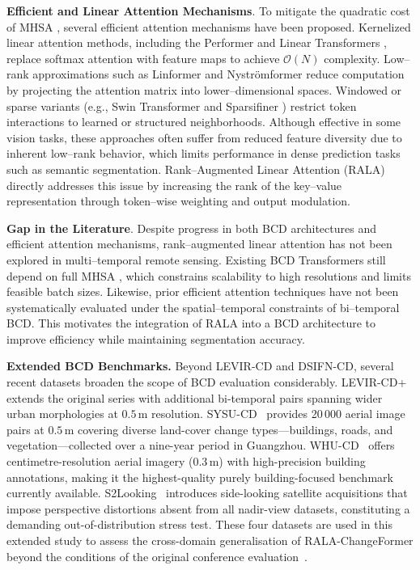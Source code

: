 \documentclass[runningheads]{llncs}
\newcommand{\journal}[1]{{\color{orange}#1}}
\begin{document}
\noindent \textbf{Efficient and Linear Attention Mechanisms}.
To mitigate the quadratic cost of MHSA \cite{Vaswani2017Attention}, several
efficient attention mechanisms have been proposed. Kernelized linear attention
methods, including the Performer \cite{Choromanski2021Performer} and Linear
Transformers \cite{Katharopoulos2020Linear}, replace softmax attention with
feature maps to achieve $\mathcal{O}(N)$ complexity. Low–rank approximations
such as Linformer \cite{Wang2020Linformer} and Nyströmformer
\cite{Xiong2021Nystromformer} reduce computation by projecting the attention
matrix into lower–dimensional spaces. Windowed or sparse variants (e.g., Swin
Transformer \cite{Liu2021Swin} and Sparsifiner \cite{Wei2023Sparsifiner})
restrict token interactions to learned or structured neighborhoods. Although
effective in some vision tasks, these approaches often suffer from reduced
feature diversity due to inherent low–rank behavior, which limits performance in
dense prediction tasks such as semantic segmentation. Rank–Augmented Linear
Attention (RALA) \cite{Fan2025RALA} directly addresses this issue by increasing
the rank of the key–value representation through token–wise weighting and output
modulation.

\noindent \textbf{Gap in the Literature}.
Despite progress in both BCD architectures and efficient attention mechanisms,
rank–augmented linear attention has not been explored in multi–temporal remote
sensing. Existing BCD Transformers still depend on full MHSA
\cite{Vaswani2017Attention}, which constrains scalability to high resolutions
and limits feasible batch sizes. Likewise, prior efficient attention techniques
have not been systematically evaluated under the spatial–temporal constraints of
bi–temporal BCD. This motivates the integration of RALA into a BCD architecture
to improve efficiency while maintaining segmentation accuracy.

\journal{%
\noindent \textbf{Extended BCD Benchmarks.}
Beyond LEVIR-CD and DSIFN-CD, several recent datasets broaden the scope of BCD
evaluation considerably.
LEVIR-CD+ \cite{Zheng2020LEVIR} extends the original series with additional
bi-temporal pairs spanning wider urban morphologies at $0.5\,\mathrm{m}$
resolution.
SYSU-CD~\cite{ShiSYSU2022} provides 20\,000 aerial image pairs at
$0.5\,\mathrm{m}$ covering diverse land-cover change types—buildings, roads,
and vegetation—collected over a nine-year period in Guangzhou.
WHU-CD~\cite{Ji2019WHU} offers centimetre-resolution aerial imagery
($0.3\,\mathrm{m}$) with high-precision building annotations, making it the
highest-quality purely building-focused benchmark currently available.
S2Looking~\cite{ShenS2Looking2021} introduces side-looking satellite acquisitions
that impose perspective distortions absent from all nadir-view datasets,
constituting a demanding out-of-distribution stress test.
These four datasets are used in this extended study to assess
the cross-domain generalisation of RALA-ChangeFormer beyond the conditions of
the original conference evaluation~\cite{acuna2026efficient}.%
}
\end{document}
